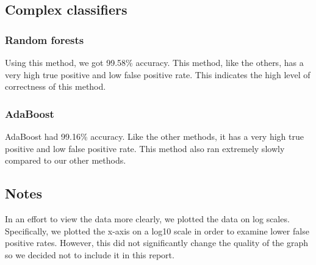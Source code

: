 \documentclass{article} %
\begin{document}
\subsection{Complex classifiers}
\subsubsection{Random forests}
Using this method, we got 99.58\% accuracy. This method, like the others, has a very high true positive and low false positive rate. This indicates the high level of correctness of this method. 

\subsubsection{AdaBoost}
AdaBoost had 99.16\% accuracy. Like the other methods, it has a very high true positive and low false positive rate. This method also ran extremely slowly compared to our other methods. 

\subsection{Notes}
In an effort to view the data more clearly, we plotted the data on log scales. Specifically, we plotted the x-axis on a log10 scale in order to examine lower false positive rates. However, this did not significantly change the quality of the graph so we decided not to include it in this report. 
\end{document}
